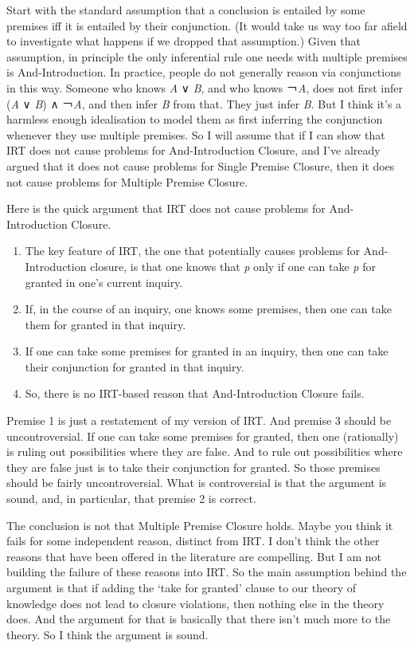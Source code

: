 \documentclass[
  11pt,
]{book}
\providecommand{\tightlist}{%
  \setlength{\itemsep}{0pt}\setlength{\parskip}{0pt}}
\begin{document}
Start with the standard assumption that a conclusion is entailed by some premises iff it is entailed by their conjunction. (It would take us way too far afield to investigate what happens if we dropped that assumption.) Given that assumption, in principle the only inferential rule one needs with multiple premises is And-Introduction. In practice, people do not generally reason via conjunctions in this way. Someone who knows \emph{A} ∨ \emph{B}, and who knows ￢\emph{A}, does not first infer (\emph{A} ∨ \emph{B}) ∧ ￢\emph{A}, and then infer \emph{B} from that. They just infer \emph{B}. But I think it's a harmless enough idealisation to model them as first inferring the conjunction whenever they use multiple premises. So I will assume that if I can show that IRT does not cause problems for And-Introduction Closure, and I've already argued that it does not cause problems for Single Premise Closure, then it does not cause problems for Multiple Premise Closure.

Here is the quick argument that IRT does not cause problems for And-Introduction Closure.

\begin{enumerate}
\def\labelenumi{\arabic{enumi}.}
\tightlist
\item
  The key feature of IRT, the one that potentially causes problems for And-Introduction closure, is that one knows that \emph{p} only if one can take \emph{p} for granted in one's current inquiry.
\item
  If, in the course of an inquiry, one knows some premises, then one can take them for granted in that inquiry.
\item
  If one can take some premises for granted in an inquiry, then one can take their conjunction for granted in that inquiry.
\item
  So, there is no IRT-based reason that And-Introduction Closure fails.
\end{enumerate}

Premise 1 is just a restatement of my version of IRT. And premise 3 should be uncontroversial. If one can take some premises for granted, then one (rationally) is ruling out possibilities where they are false. And to rule out possibilities where they are false just is to take their conjunction for granted. So those premises should be fairly uncontroversial. What is controversial is that the argument is sound, and, in particular, that premise 2 is correct.

The conclusion is not that Multiple Premise Closure holds. Maybe you think it fails for some independent reason, distinct from IRT. I don't think the other reasons that have been offered in the literature are compelling. But I am not building the failure of these reasons into IRT. So the main assumption behind the argument is that if adding the `take for granted' clause to our theory of knowledge does not lead to closure violations, then nothing else in the theory does. And the argument for that is basically that there isn't much more to the theory. So I think the argument is sound.
\end{document}
